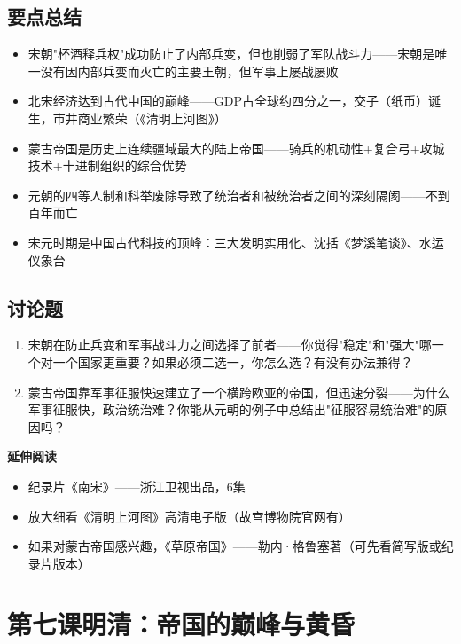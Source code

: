 \documentclass[a4paper,12pt]{ctexart}
\begin{document}
\subsection*{要点总结}
\begin{itemize}
  \item 宋朝"杯酒释兵权"成功防止了内部兵变，但也削弱了军队战斗力——宋朝是唯一没有因内部兵变而灭亡的主要王朝，但军事上屡战屡败
  \item 北宋经济达到古代中国的巅峰——GDP占全球约四分之一，交子（纸币）诞生，市井商业繁荣（《清明上河图》）
  \item 蒙古帝国是历史上连续疆域最大的陆上帝国——骑兵的机动性+复合弓+攻城技术+十进制组织的综合优势
  \item 元朝的四等人制和科举废除导致了统治者和被统治者之间的深刻隔阂——不到百年而亡
  \item 宋元时期是中国古代科技的顶峰：三大发明实用化、沈括《梦溪笔谈》、水运仪象台
\end{itemize}

\subsection*{讨论题}
\begin{enumerate}
  \item 宋朝在防止兵变和军事战斗力之间选择了前者——你觉得"稳定"和"强大"哪一个对一个国家更重要？如果必须二选一，你怎么选？有没有办法兼得？
  \item 蒙古帝国靠军事征服快速建立了一个横跨欧亚的帝国，但迅速分裂——为什么军事征服快，政治统治难？你能从元朝的例子中总结出"征服容易统治难"的原因吗？
\end{enumerate}

\vspace{0.3cm}
\textcolor{blue!70!black}{\textbf{延伸阅读}}
\begin{itemize}
  \item 纪录片《南宋》——浙江卫视出品，6集
  \item 放大细看《清明上河图》高清电子版（故宫博物院官网有）
  \item 如果对蒙古帝国感兴趣，《草原帝国》——勒内·格鲁塞著（可先看简写版或纪录片版本）
\end{itemize}

\newpage

\section{\textcolor{orange!80!black}{第七课\quad 明清：帝国的巅峰与黄昏}}
\end{document}
